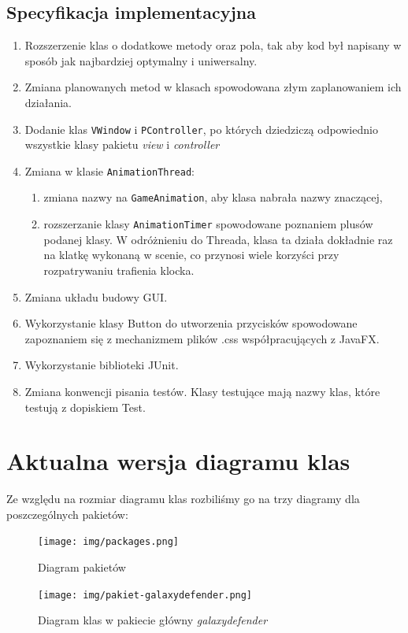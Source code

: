 \documentclass[a4paper]{article}
\newcommand{\prog}{\texttt}
\begin{document}
\subsection{Specyfikacja implementacyjna}
\begin{enumerate}
    \item Rozszerzenie klas o dodatkowe metody oraz pola, tak aby kod był napisany w sposób jak najbardziej optymalny i uniwersalny.
    \item Zmiana planowanych metod w klasach spowodowana złym zaplanowaniem ich działania.
    \item Dodanie klas \prog{VWindow} i \prog{PController}, po których dziedziczą odpowiednio wszystkie klasy pakietu \textit{view} i \textit{controller}
    \item Zmiana w klasie \prog{AnimationThread}:
    \begin{enumerate}
        \item zmiana nazwy na \prog{GameAnimation}, aby klasa nabrała nazwy znaczącej,
        \item rozszerzanie klasy \prog{AnimationTimer} spowodowane poznaniem plusów podanej klasy. W odróżnieniu do Threada, klasa ta działa dokładnie raz na klatkę wykonaną w scenie, co przynosi wiele korzyści przy rozpatrywaniu trafienia klocka.
    \end{enumerate}
    \item Zmiana układu budowy GUI.
    \item Wykorzystanie klasy Button do utworzenia przycisków spowodowane zapoznaniem się z mechanizmem plików .css współpracujących z JavaFX.
    \item Wykorzystanie biblioteki JUnit.
    \item Zmiana konwencji pisania testów. Klasy testujące mają nazwy klas, które testują z dopiskiem Test.
\end{enumerate}

\section{Aktualna wersja diagramu klas}
Ze względu na rozmiar diagramu klas rozbiliśmy go na trzy diagramy dla poszczególnych pakietów:
\begin{figure}[H]
    \centering
    \texttt{[image: img/packages.png]}
    \caption{Diagram pakietów}
    \label{fig:packages}
\end{figure}

\begin{figure}[H]
    \centering
    \texttt{[image: img/pakiet-galaxydefender.png]}
    \caption{Diagram klas w pakiecie główny \textit{galaxydefender}}
    \label{fig:pack1}
\end{figure}
\end{document}
